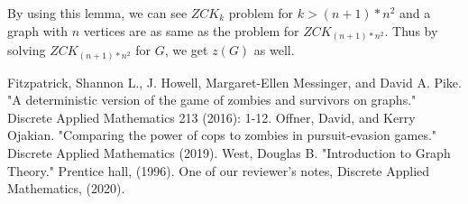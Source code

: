 \documentclass[1p]{elsarticle}
\begin{document}
	By using this lemma, we can see $ZCK_k$ problem for $k > (n + 1) * n^2$ and a graph with $n$ vertices are as same as
	the problem for $ZCK_{(n + 1) * n^2}$. Thus by solving $ZCK_{(n + 1) * n^2}$ for $G$, we get $z(G)$ as well.

\begin{thebibliography}{999}
	
	Fitzpatrick, Shannon L., J. Howell, Margaret-Ellen Messinger, and David A. Pike. "A deterministic version of the
	game of zombies and survivors on graphs." Discrete Applied Mathematics 213 (2016): 1-12.
	Offner, David, and Kerry Ojakian. "Comparing the power of cops to zombies in pursuit-evasion games." Discrete
	Applied Mathematics (2019).
	West, Douglas B. "Introduction to Graph Theory." Prentice hall, (1996).
	One of our reviewer's notes, Discrete Applied Mathematics, (2020).
\end{thebibliography}
	
\end{document}
